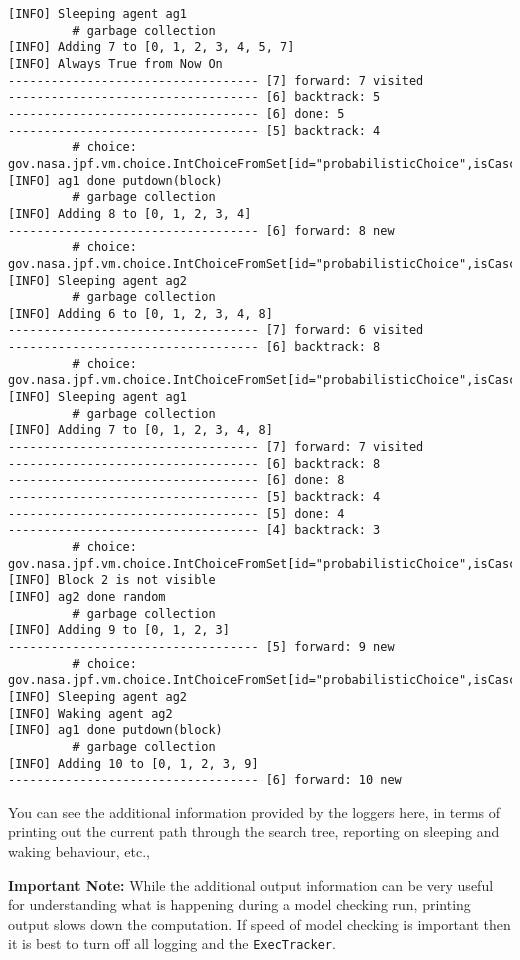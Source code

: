 \begin{verbatim}
[INFO] Sleeping agent ag1
		 # garbage collection
[INFO] Adding 7 to [0, 1, 2, 3, 4, 5, 7]
[INFO] Always True from Now On
----------------------------------- [7] forward: 7 visited
----------------------------------- [6] backtrack: 5
----------------------------------- [6] done: 5
----------------------------------- [5] backtrack: 4
		 # choice: gov.nasa.jpf.vm.choice.IntChoiceFromSet[id="probabilisticChoice",isCascaded:false,0,>1]
[INFO] ag1 done putdown(block)
		 # garbage collection
[INFO] Adding 8 to [0, 1, 2, 3, 4]
----------------------------------- [6] forward: 8 new
		 # choice: gov.nasa.jpf.vm.choice.IntChoiceFromSet[id="probabilisticChoice",isCascaded:false,>0,1]
[INFO] Sleeping agent ag2
		 # garbage collection
[INFO] Adding 6 to [0, 1, 2, 3, 4, 8]
----------------------------------- [7] forward: 6 visited
----------------------------------- [6] backtrack: 8
		 # choice: gov.nasa.jpf.vm.choice.IntChoiceFromSet[id="probabilisticChoice",isCascaded:false,0,>1]
[INFO] Sleeping agent ag1
		 # garbage collection
[INFO] Adding 7 to [0, 1, 2, 3, 4, 8]
----------------------------------- [7] forward: 7 visited
----------------------------------- [6] backtrack: 8
----------------------------------- [6] done: 8
----------------------------------- [5] backtrack: 4
----------------------------------- [5] done: 4
----------------------------------- [4] backtrack: 3
		 # choice: gov.nasa.jpf.vm.choice.IntChoiceFromSet[id="probabilisticChoice",isCascaded:false,0,>1]
[INFO] Block 2 is not visible
[INFO] ag2 done random
		 # garbage collection
[INFO] Adding 9 to [0, 1, 2, 3]
----------------------------------- [5] forward: 9 new
		 # choice: gov.nasa.jpf.vm.choice.IntChoiceFromSet[id="probabilisticChoice",isCascaded:false,>0,1]
[INFO] Sleeping agent ag2
[INFO] Waking agent ag2
[INFO] ag1 done putdown(block)
		 # garbage collection
[INFO] Adding 10 to [0, 1, 2, 3, 9]
----------------------------------- [6] forward: 10 new
\end{verbatim}
You can see the additional information provided by the loggers here, in terms of printing out the current path through the search tree, reporting on sleeping and waking behaviour, etc.,

{\bf Important Note:} While the additional output information can be very useful for understanding what is happening during a model checking run, printing output slows down the computation.  If speed of model checking is important then it is best to turn off all logging and the \texttt{ExecTracker}.

